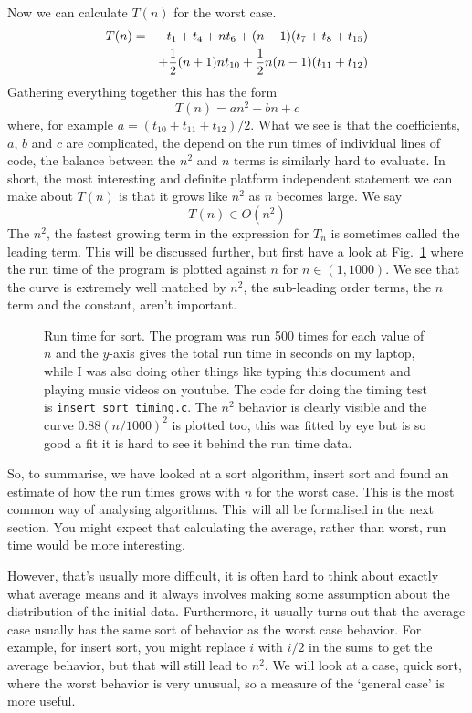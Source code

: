 \documentclass[11pt,a4paper]{scrartcl}
\begin{document}
Now we can calculate $T(n)$ for the worst case.
\begin{eqnarray}
T(n)&=&t_1+t_4+nt_6+(n-1)(t_7+t_8+t_{15})\cr&&+\frac{1}{2}(n+1)nt_{10}+\frac{1}{2}n(n-1)(t_{11}+t_{12})
\end{eqnarray}
Gathering everything together this has the form
\begin{equation}
T(n)=an^2+bn+c
\end{equation}
where, for example $a=(t_{10}+t_{11}+t_{12})/2$. What we see is that
the coefficients, $a$, $b$ and $c$ are complicated, the depend on the
run times of individual lines of code, the balance between the $n^2$
and $n$ terms is similarly hard to evaluate. In short, the most
interesting and definite platform independent statement we can make
about $T(n)$ is that it grows like $n^2$ as $n$ becomes large. We say
\begin{equation}
T(n)\in O(n^2)
\end{equation}
The $n^2$, the fastest growing term in the expression for $T_n$ is
sometimes called the leading term. This will be discussed further, but
first have a look at Fig.~\ref{fig_insert_sort_timing} where the run
time of the program is plotted against $n$ for $n\in(1,1000)$. We see
that the curve is extremely well matched by $n^2$, the sub-leading
order terms, the $n$ term and the constant, aren't important.

\begin{figure}

\caption{Run time for sort. The program was run 500 times for each
  value of $n$ and the $y$-axis gives the total run time in seconds on
  my laptop, while I was also doing other things like typing this
  document and playing music videos on youtube. The code for doing the
  timing test is {\tt insert\_sort\_timing.c}. The $n^2$ behavior is
  clearly visible and the curve $0.88(n/1000)^2$ is plotted too, this
  was fitted by eye but is so good a fit it is hard to see it behind
  the run time data.\label{fig_insert_sort_timing}}
\end{figure}

So, to summarise, we have looked at a sort algorithm, insert sort and
found an estimate of how the run times grows with $n$ for the worst
case. This is the most common way of analysing algorithms. This will
all be formalised in the next section. You might expect that
calculating the average, rather than worst, run time would be more
interesting. 

However, that's usually more difficult, it is often hard to think
about exactly what average means and it always involves making some
assumption about the distribution of the initial data. Furthermore, it
usually turns out that the average case usually has the same sort of
behavior as the worst case behavior. For example, for insert sort, you
might replace $i$ with $i/2$ in the sums to get the average behavior,
but that will still lead to $n^2$. We will look at a case, quick sort,
where the worst behavior is very unusual, so a measure of the
\lq{}general case\rq{} is more useful.
\end{document}
